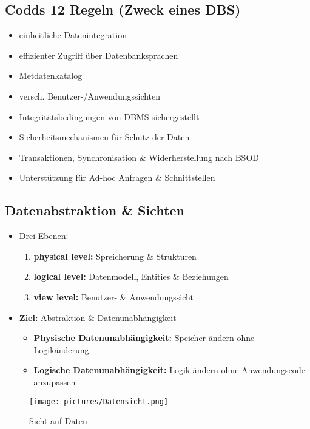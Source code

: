 \documentclass[12pt,a4paper]{article}
\begin{document}
\subsection{Codds 12 Regeln (Zweck eines DBS)}

\begin{itemize}
\item einheitliche Datenintegration
\item effizienter Zugriff über Datenbanksprachen
\item Metdatenkatalog
\item versch. Benutzer-/Anwendungssichten
\item Integritätsbedingungen von DBMS sichergestellt
\item Sicherheitsmechanismen für Schutz der Daten
\item Transaktionen, Synchronisation \& Widerherstellung nach BSOD
\item Unterstützung für Ad-hoc Anfragen \& Schnittstellen
\end{itemize}

\subsection{Datenabstraktion \& Sichten}

\begin{itemize}
\item Drei Ebenen:
\begin{enumerate}
\item \textbf{physical level:} Spreicherung \& Strukturen
\item \textbf{logical level:} Datenmodell, Entities \& Beziehungen
\item \textbf{view level:} Benutzer- \& Anwendungssicht
\end{enumerate}
\item \textbf{Ziel:} Abstraktion \& Datenunabhängigkeit
\begin{itemize}
\item \textbf{Physische Datenunabhängigkeit:} Speicher ändern ohne Logikänderung
\item \textbf{Logische Datenunabhängigkeit:} Logik ändern ohne Anwendungscode anzupassen
\end{itemize}
\end{itemize}

\begin{figure}[H]
\centering
\texttt{[image: pictures/Datensicht.png]}
\caption{Sicht auf Daten}
\end{figure}
\end{document}
